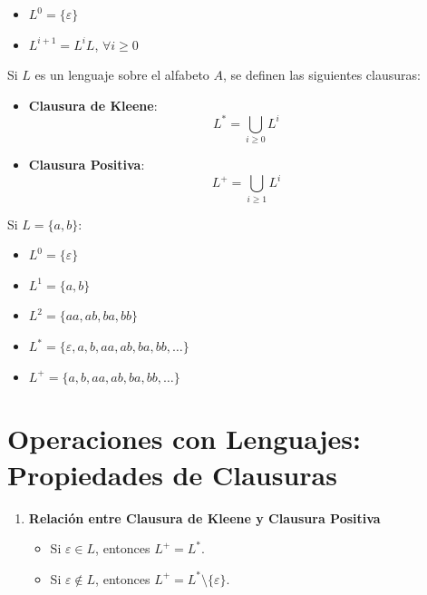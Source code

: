 \documentclass[12pt]{book} %
\providecommand{\tightlist}{%
  \setlength{\itemsep}{0pt}\setlength{\parskip}{0pt}}
\begin{document}
\begin{itemize}
\tightlist
\item
  \(L^0 = \{\varepsilon\}\)\\
\item
  \(L^{i+1} = L^iL\), \(\forall i \geq 0\)
\end{itemize}

Si \(L\) es un lenguaje sobre el alfabeto \(A\), se definen las
siguientes clausuras:

\begin{itemize}
\item
  \textbf{Clausura de Kleene}:\\
  \[
    L^* = \bigcup_{i \geq 0} L^i
    \]
\item
  \textbf{Clausura Positiva}:\\
  \[
    L^+ = \bigcup_{i \geq 1} L^i
    \]
\end{itemize}

\begin{ejemplo}
Si $L = \{a, b\}$:  
\begin{itemize}
    \item $L^0 = \{\varepsilon\}$  
    \item $L^1 = \{a, b\}$  
    \item $L^2 = \{aa, ab, ba, bb\}$  
    \item $L^* = \{\varepsilon, a, b, aa, ab, ba, bb, \ldots\}$  
    \item $L^+ = \{a, b, aa, ab, ba, bb, \ldots\}$  
\end{itemize}
\end{ejemplo}

\hypertarget{operaciones-con-lenguajes-propiedades-de-clausuras}{%
\section{Operaciones con Lenguajes: Propiedades de
Clausuras}\label{operaciones-con-lenguajes-propiedades-de-clausuras}}

\begin{enumerate}
\def\labelenumi{\arabic{enumi}.}
\tightlist
\item
  \textbf{Relación entre Clausura de Kleene y Clausura Positiva}

  \begin{itemize}
  \tightlist
  \item
    Si \(\varepsilon \in L\), entonces \(L^+ = L^*\).\\
  \item
    Si \(\varepsilon \notin L\), entonces
    \(L^+ = L^* \setminus \{\varepsilon\}\).
  \end{itemize}
\end{enumerate}
\end{document}
